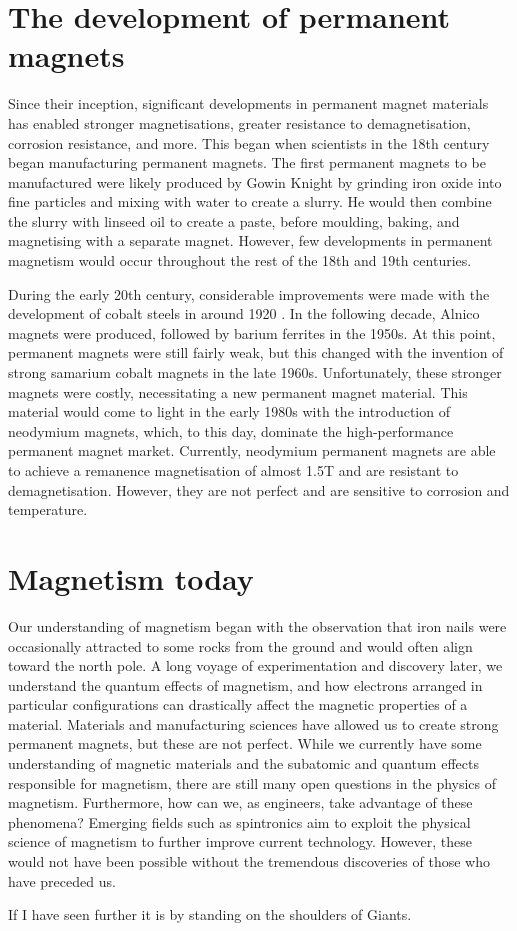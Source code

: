 \section*{The development of permanent magnets}
Since their inception, significant developments in permanent magnet materials has enabled stronger magnetisations, greater resistance to demagnetisation, corrosion resistance, and more. This began when scientists in the 18th century began manufacturing permanent magnets. The first permanent magnets to be manufactured were likely produced by Gowin Knight \cite{Moskowitz1995} by grinding iron oxide into fine particles and mixing with water to create a slurry. He would then combine the slurry with linseed oil to create a paste, before moulding, baking, and magnetising with a separate magnet. However, few developments in permanent magnetism would occur throughout the rest of the 18th and 19th centuries.

During the early 20th century, considerable improvements were made with the development of cobalt steels in around 1920 \cite{Zhukov2016}. In the following decade, Alnico magnets were produced, followed by barium ferrites in the 1950s. At this point, permanent magnets were still fairly weak, but this changed with the invention of strong samarium cobalt magnets in the late 1960s. Unfortunately, these stronger magnets were costly, necessitating a new permanent magnet material. This material would come to light in the early 1980s with the introduction of neodymium magnets, which, to this day, dominate the high-performance permanent magnet market. Currently, neodymium permanent magnets are able to achieve a remanence magnetisation of almost 1.5\si{\tesla} and are resistant to demagnetisation. However, they are not perfect and are sensitive to corrosion and temperature.

\section*{Magnetism today}
Our understanding of magnetism began with the observation that iron nails were occasionally attracted to some rocks from the ground and would often align toward the north pole. A long voyage of experimentation and discovery later, we understand the quantum effects of magnetism, and how electrons arranged in particular configurations can drastically affect the magnetic properties of a material. Materials and manufacturing sciences have allowed us to create strong permanent magnets, but these are not perfect. While we currently have some understanding of magnetic materials and the subatomic and quantum effects responsible for magnetism, there are still many open questions in the physics of magnetism. Furthermore, how can we, as engineers, take advantage of these phenomena? Emerging fields such as spintronics aim to exploit the physical science of magnetism to further improve current technology. However, these would not have been possible without the tremendous discoveries of those who have preceded us.

\vspace{1cm}
\begin{quoting}
    If I have seen further it is by standing on the shoulders of Giants.
\end{quoting}

\newpage
\printbibliography[title=References]